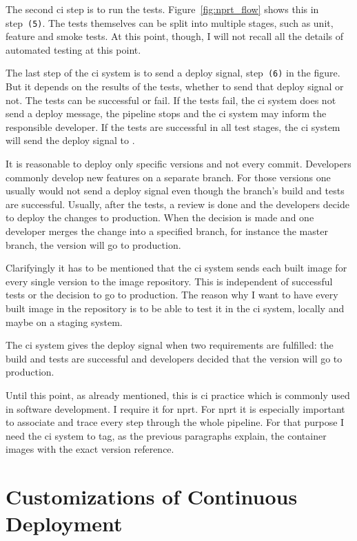 The second \gls{ci} step is to run the tests. Figure~\ref{fig:nprt_flow} shows this in
step~\texttt{(5)}. The tests themselves can be split into multiple stages, such as unit,
feature and smoke tests. At this point, though, I will not recall all the details of
automated testing at this point.

The last step of the \gls{ci} system is to send a deploy signal, step~\texttt{(6)} in the
figure. But it depends on the results of the tests, whether to send that deploy signal or
not. The tests can be successful or fail. If the tests fail, the \gls{ci} system does not
send a deploy message, the pipeline stops and the \gls{ci} system may inform the
responsible developer. If the tests are successful in all test stages, the \gls{ci} system
will send the deploy signal to \deployer{}.

It is reasonable to deploy only specific versions and not every commit. Developers
commonly develop new features on a separate branch. For those
versions one usually would not send a deploy signal even though the branch's build and tests
are successful. Usually, after the tests, a review is done and the developers decide to
deploy the changes to production. When the decision is made and one developer merges the
change into a specified branch, for instance the master branch, the version will go to
production.

Clarifyingly it has to be mentioned that the \gls{ci} system sends each built image for
every single version to the image repository. This is independent of successful tests or
the decision to go to production. The reason why I want to have every built image in the
repository is to be able to test it in the \gls{ci} system, locally and maybe on a staging
system.

The \gls{ci} system gives the deploy signal when two requirements are fulfilled: the build
and tests are successful and developers decided that the version will go to production.

Until this point, as already mentioned, this is \gls{ci} practice which is commonly used
in software development. I require it for \gls{nprt}. For \gls{nprt} it is especially
important to associate and trace every step through the whole pipeline. For that purpose I
need the \gls{ci} system to tag, as the previous paragraphs explain, the container images
with the exact version reference.

\section{Customizations of Continuous Deployment}

